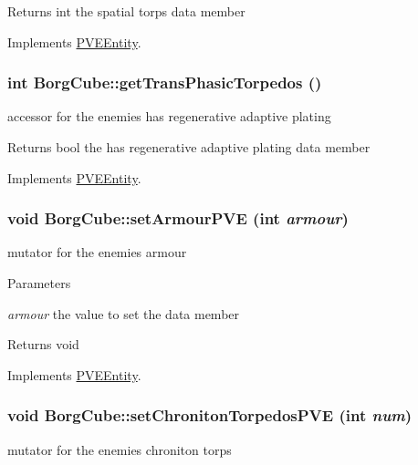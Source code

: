 \begin{DoxyReturn}{Returns}
int the spatial torps data member 
\end{DoxyReturn}


Implements \hyperlink{classPVEEntity}{PVEEntity}.

\hypertarget{classBorgCube_a07417d4ed25e0d0efce29f3b5796dbc3}{
\subsubsection[{getTransPhasicTorpedos}]{\setlength{\rightskip}{0pt plus 5cm}int BorgCube::getTransPhasicTorpedos ()}}
\label{d2/d93/classBorgCube_a07417d4ed25e0d0efce29f3b5796dbc3}
accessor for the enemies has regenerative adaptive plating

\begin{DoxyReturn}{Returns}
bool the has regenerative adaptive plating data member 
\end{DoxyReturn}


Implements \hyperlink{classPVEEntity}{PVEEntity}.

\hypertarget{classBorgCube_acf52ecf22eced30bb13babcf67834c6a}{
\subsubsection[{setArmourPVE}]{\setlength{\rightskip}{0pt plus 5cm}void BorgCube::setArmourPVE (int {\em armour})}}
\label{d2/d93/classBorgCube_acf52ecf22eced30bb13babcf67834c6a}
mutator for the enemies armour


\begin{DoxyParams}{Parameters}
\item[{\em armour}]the value to set the data member\end{DoxyParams}
\begin{DoxyReturn}{Returns}
void 
\end{DoxyReturn}


Implements \hyperlink{classPVEEntity}{PVEEntity}.

\hypertarget{classBorgCube_a1a4a73eb1b38f0d8b79445d8e4be691f}{
\subsubsection[{setChronitonTorpedosPVE}]{\setlength{\rightskip}{0pt plus 5cm}void BorgCube::setChronitonTorpedosPVE (int {\em num})}}
\label{d2/d93/classBorgCube_a1a4a73eb1b38f0d8b79445d8e4be691f}
mutator for the enemies chroniton torps


